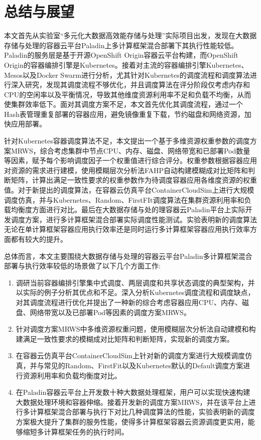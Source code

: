 \chapter{总结与展望}
本文首先从实验室“多元化大数据高效能存储与处理”实际项目出发，发现在大数据存储与处理的容器云平台Paladin上多计算框架混合部署下其执行性能较低。Paladin的服务层是基于开源OpenShift Origin容器云平台构建，而OpenShift Origin的容器编排引擎是Kubernetes。接着对主流的容器编排引擎Kubernetes、Mesos以及Docker Swarm进行分析，尤其针对Kubernetes的调度流程和调度算法进行深入研究，发现其调度流程不够优化，并且调度算法在评分阶段仅考虑内存和CPU的空闲率以及平衡情况，导致其他维度资源利用率不足和负载不均衡，从而使集群效率低下。面对其调度方案不足，本文首先优化其调度流程，通过一个Hash表管理重复部署的容器应用，避免镜像重复下载，节约磁盘和网络资源，加快应用部署。

针对Kubernetes容器调度算法不足，本文提出一个基于多维资源权重参数的调度方案MRWS，综合考虑集群中节点CPU、内存、磁盘、网络带宽和已部署Pod数量等因素，赋予每个影响调度因子一个权重值进行综合评分。权重参数根据容器应用对资源的需求进行建模，使用模糊层次分析法FAHP自动构建模糊成对比矩阵和判断矩阵，计算出满足一致性要求的权重参数作为待调度容器应用各维度资源的权重值。对于新提出的调度算法，在容器云仿真平台ContainerCloudSim上进行大规模调度仿真，并与Kubernetes、Random、FirstFIt调度算法在集群资源利用率和负载均衡度方面进行对比。最后在大数据存储与处的理容器云Paladin平台上实际开发调度方案，进行多计算框架混合部署实际调度性能测试。实验表明新的调度算法无论在单计算框架容器应用执行效率还是同时运行多计算框架容器应用执行效率方面都有较大的提升。

总体而言，本文主要围绕大数据存储与处理的容器云平台Paladin多计算框架混合部署与执行效率较低的场景做了以下几个方面工作:
\begin{enumerate}[(1)]
	\item 调研当前容器编排引擎集中式调度、两层调度和共享状态调度的典型架构，并以实际的例子分析其优点和不足。深入分析Kubernetes调度流程和调度缺点，对其调度流程进行优化并提出了一种新的综合考虑容器应用CPU、内存、磁盘、网络带宽以及已部署Pod等因素的调度方案MRWS。
	\item 针对调度方案MRWS中多维资源权重问题，使用模糊层次分析法自动建模和构建满足一致性要求的模糊成对比矩阵和判断矩阵，实现新的调度方案。
	\item 在容器云仿真平台ContainerCloudSim上针对新的调度方案进行大规模调度仿真，并与常见的Random、FirstFit以及Kubernetes默认的Default调度方案进行资源利用率和负载均衡度对比。
	\item 在Paladin容器云平台上开发数十种大数据处理框架，用户可以实现快速构建大数据处理环境和容器伸缩。接着开发新的调度方案MRWS，并在该平台上进行多计算框架混合部署与执行下对比几种调度算法的性能，实验表明新的调度方案极大提升了集群的服务性能，使得多计算框架容器云资源调度更实用，能够缩短多计算框架任务的执行时间。
\end{enumerate}

